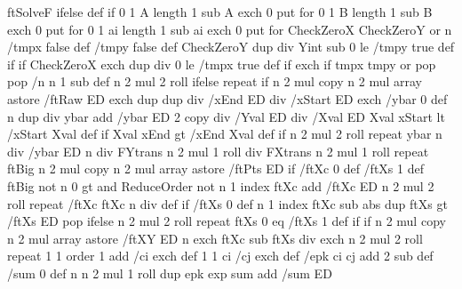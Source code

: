 {{{{      }{ ftSolveF } ifelse } def
  } if
  0 1 A length 1 sub { A exch 0 put } for
  0 1 B length 1 sub { B exch 0 put } for
  0 1 ai length 1 sub { ai exch 0 put } for
  CheckZeroX CheckZeroY or {
  n { /tmpx false def /tmpy false def
    CheckZeroY { dup \pst@number\psyunit\space div Yint sub 0 le { /tmpy true def  } if } if  
    CheckZeroX { exch dup \pst@number\psxunit\space div 0 le { /tmpx true def } if exch } if
    tmpx tmpy or { pop pop /n n 1 sub def }{ n 2 mul 2 roll } ifelse
    } repeat } if
  n 2 mul copy n 2 mul array astore /ftRaw ED
  exch dup dup
  \pst@number\psxunit\space div /xEnd ED
  \pst@number\psxunit\space div /xStart ED    
  exch
  /ybar 0 def
  n {                         %
    dup \pst@number\psyunit\space div ybar add /ybar ED
    2 copy      %
    \pst@number\psyunit\space div /Yval ED
    \pst@number\psxunit\space div /Xval ED
    Xval xStart lt { /xStart Xval def } if    %
    Xval xEnd gt { /xEnd Xval def } if        %
    n 2 mul 2 roll    %
  } repeat
  ybar n div /ybar ED
  n {
    \pst@number\psyunit\space div FYtrans
    n 2 mul 1 roll
    \pst@number\psxunit\space div FXtrans
    n 2 mul 1 roll
  } repeat
  ftBig { n 2 mul copy n 2 mul array astore /ftPts ED } if
  /ftXc 0 def /ftXs 1 def
  ftBig not n 0 gt and {
    ReduceOrder not {
      n { 1 index ftXc add /ftXc ED n 2 mul 2 roll } repeat
      /ftXc ftXc n div def } if
    /ftXs 0 def
    n { 1 index ftXc sub abs dup ftXs gt { /ftXs ED }{ pop } ifelse n 2 mul 2 roll } repeat
    ftXs 0 eq { /ftXs 1 def } if
  } if
  n 2 mul copy n 2 mul array astore /ftXY ED
  n { exch ftXc sub ftXs div exch n 2 mul 2 roll } repeat
  1 1 order 1 add { /ci exch def
    1 1 ci { /cj exch def
      /epk ci cj add 2 sub def
      /sum 0 def
      n { n 2 mul 1 roll
        dup epk exp sum add /sum ED
}}}}
